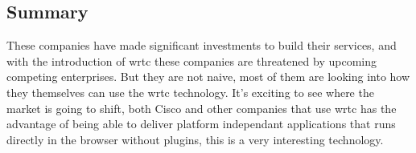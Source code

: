 \subsection*{Summary}
These companies have made significant investments to build their services, and with the introduction of \gls{wrtc} these companies are threatened by upcoming competing enterprises. But they are not naive, most of them are looking into how they themselves can use the \gls{wrtc} technology. It's exciting to see where the market is going to shift, both Cisco and other companies that use \gls{wrtc} has the advantage of being able to deliver platform independant applications that runs directly in the browser without plugins, this is a very interesting technology.